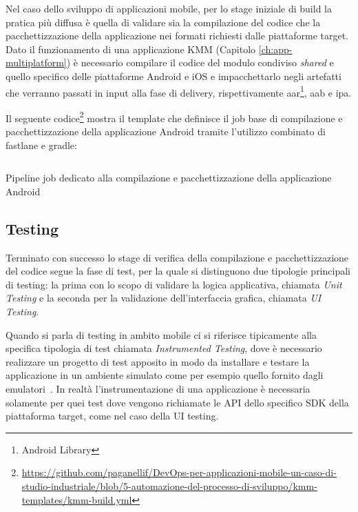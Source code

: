 Nel caso dello sviluppo di applicazioni mobile, per lo stage iniziale di build la pratica più diffusa è quella di validare sia la compilazione del codice che la pacchettizzazione della applicazione nei formati richiesti dalle piattaforme target. Dato il funzionamento di una applicazione KMM (Capitolo \ref{ch:app-multiplatform}) è necessario compilare il codice del modulo condiviso \textit{shared} e quello specifico delle piattaforme Android e iOS e impacchettarlo negli artefatti che verranno passati in input alla fase di delivery, rispettivamente aar\footnote{Android Library}, aab e ipa.

Il seguente codice\footnote{\href{https://github.com/paganellif/DevOps-per-applicazioni-mobile-un-caso-di-studio-industriale/blob/5-automazione-del-processo-di-sviluppo/kmm-templates/kmm-build.yml}{https://github.com/paganellif/DevOps-per-applicazioni-mobile-un-caso-di-studio-industriale/blob/5-automazione-del-processo-di-sviluppo/kmm-templates/kmm-build.yml}} mostra il template che definisce il job base di compilazione e pacchettizzazione della applicazione Android tramite l'utilizzo combinato di fastlane e gradle:

\begin{listing}[H]
    \inputminted{yaml}{code/build-job.yaml}
    \caption{Pipeline job dedicato alla compilazione e pacchettizzazione della applicazione Android}
\end{listing}

\subsection{Testing}
Terminato con successo lo stage di verifica della compilazione e pacchettizzazione del codice segue la fase di test, per la quale si distinguono due tipologie principali di testing: la prima con lo scopo di validare la logica applicativa, chiamata \textit{Unit Testing} e la seconda per la validazione dell'interfaccia grafica, chiamata \textit{UI Testing}.

Quando si parla di testing in ambito mobile ci si riferisce tipicamente alla specifica tipologia di test chiamata \textit{Instrumented Testing}, dove è necessario realizzare un progetto di test apposito in modo da installare e testare la applicazione in un ambiente simulato come per esempio quello fornito dagli emulatori~\cite{darwin2011android}. In realtà l'instrumentazione di una applicazione è necessaria solamente per quei test dove vengono richiamate le API dello specifico SDK della piattaforma target, come nel caso della UI testing.

